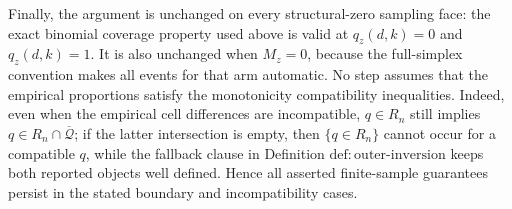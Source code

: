 Finally, the argument is unchanged on every structural-zero sampling face: the exact binomial coverage property used above is valid at \(q_z(d,k)=0\) and \(q_z(d,k)=1\).  It is also unchanged when \(M_z=0\), because the full-simplex convention makes all events for that arm automatic.  No step assumes that the empirical proportions satisfy the monotonicity compatibility inequalities.  Indeed, even when the empirical cell differences are incompatible, \(q\in R_n\) still implies \(q\in R_n\cap\overline{\mathcal Q}\); if the latter intersection is empty, then \(\{q\in R_n\}\) cannot occur for a compatible \(q\), while the fallback clause in Definition \(\mathrm{def:outer\text{-}inversion}\) keeps both reported objects well defined.  Hence all asserted finite-sample guarantees persist in the stated boundary and incompatibility cases.
